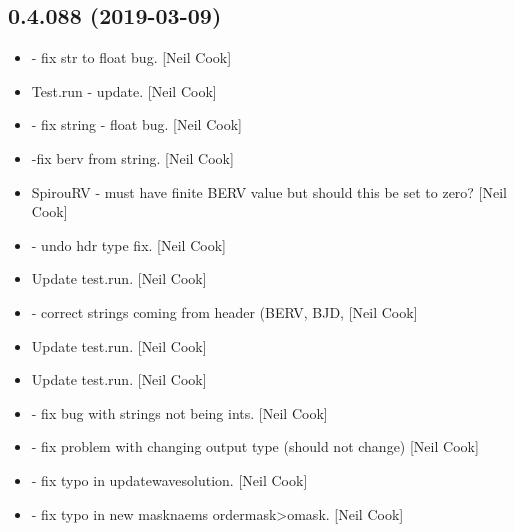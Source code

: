 \documentclass[a4paper,10pt,english]{report}
\begin{document}
\subsection{0.4.088 (2019-03-09)}
\label{\detokenize{misc/changelog:id172}}\begin{itemize}
\item {} 
 - fix str to float bug. {[}Neil Cook{]}

\item {} 
Test.run - update. {[}Neil Cook{]}

\item {} 
 - fix string - float bug. {[}Neil Cook{]}

\item {} 
 -fix berv from string. {[}Neil Cook{]}

\item {} 
SpirouRV - must have finite BERV value \textendash{} but should this be set to
zero? {[}Neil Cook{]}

\item {} 
 - undo hdr type fix. {[}Neil Cook{]}

\item {} 
Update test.run. {[}Neil Cook{]}

\item {} 
 - correct strings coming from header (BERV, BJD,
 {[}Neil Cook{]}

\item {} 
Update test.run. {[}Neil Cook{]}

\item {} 
Update test.run. {[}Neil Cook{]}

\item {} 
 - fix bug with strings not being ints. {[}Neil Cook{]}

\item {} 
 - fix problem with changing output type (should not
change) {[}Neil Cook{]}

\item {} 
 - fix typo in updatewavesolution. {[}Neil Cook{]}

\item {} 
 - fix typo in new masknaems ordermask\textendash{}\textgreater{}omask. {[}Neil
Cook{]}


\end{itemize}
\end{document}
